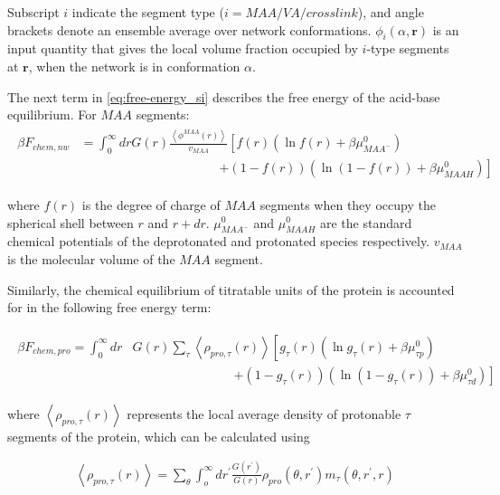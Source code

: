 \documentclass[journal=jacsat,manuscript=suppinfo]{achemso}
\begin{document}
\noindent  Subscript $i$ indicate the segment type ($i = MAA/VA/crosslink$), and angle brackets denote an ensemble average over network conformations. 
$\phi_i(\alpha,\textbf{r})$  is an input quantity that gives the local volume fraction occupied by $i$-type segments at $\textbf{r}$, when the network is in conformation $\alpha$.





The next term in \cref{eq:free-energy_si} describes the free energy of the acid-base equilibrium.
For $MAA$ segments:
\begin{align}
	\begin{aligned}
		\beta F_{chem,nw} &= \int_0^\infty drG(r) \frac{\left<\phi^{MAA}(r)\right>}{v_{MAA}} \left[f(r)(\ln f(r)+ \beta\mu^0_{MAA^-})\right.\\
		&\hspace{11em}\left.+(1-f(r))(\ln (1-f(r))+\beta\mu^0_{MAAH})\right]    
	\end{aligned}
\end{align} 


\noindent where $f(r)$ is the degree of charge of $MAA$ segments when they occupy  the spherical shell between $r$ and $r + dr$. 
$\mu^0_{MAA^-}$ and $\mu^0_{MAAH}$ are the standard chemical potentials of the deprotonated and protonated species respectively. $v_{MAA}$ is the molecular volume of the $MAA$ segment.



Similarly, the chemical equilibrium of titratable units of the protein is accounted for in the following free energy term:

\begin{align}
	\begin{aligned}
		\beta F_{chem,pro} =\int_0^\infty dr &G(r) \sum_\tau \left<\rho_{pro,\tau}(r)\right> \left[g_\tau(r)(\ln g_\tau(r)+ \beta\mu^0_{\tau p})\right.\\
		&\hspace{8em}\left.+(1-g_\tau(r))(\ln (1-g_\tau(r))+\beta\mu^0_{\tau d})\right]   
		\label{eq:Fchempro_si}
	\end{aligned}
\end{align} 

\noindent where $\left<\rho_{pro,\tau}(r)\right>$ represents the local average density of protonable $\tau$ segments of the protein, which can be calculated using

\begin{align}
	\left<\rho_{pro,\tau}(r)\right> = \sum_\theta \int_o^\infty dr^\prime \frac{G(r^\prime)}{G(r)} \rho_{pro}(\theta,r^\prime)m_\tau(\theta,r^\prime,r)
	\label{eq:segments_pro_si}
\end{align}
\end{document}
